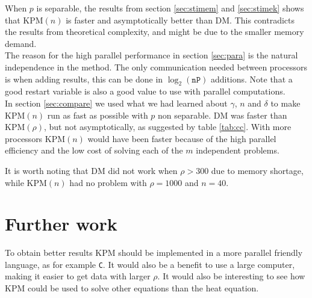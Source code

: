 When $p$ is separable, the results from section \ref{sec:stimem} and \ref{sec:stimek} shows that KPM$(n)$ is faster and asymptotically better than DM. This contradicts the results from theoretical complexity, and might be due to the smaller memory demand. \\


The reason for the high parallel performance in section \ref{sec:para} is the natural independence in the method. The only communication needed between processors is when adding results, this can be done in $\log_2(\texttt{nP})$ additions. Note that a good restart variable is also a good value to use with parallel computations. \\

In section \ref{sec:compare} we used what we had learned about $\gamma$, $n$ and $\delta$ to make KPM$(n)$ run as fast as possible with $p$ non separable. DM was faster than KPM$(\rho)$, but not asymptotically, as suggested by table \ref{tab:cc}. With more processors KPM$(n)$ would have been faster because of the high parallel efficiency and the low cost of solving each of the $m$ independent problems.

It is worth noting that DM did not work when $\rho>300$ due to memory shortage, while KPM$(n)$ had no problem with $\rho = 1000$ and $n = 40$. \\




\chapter*{Further work}%
To obtain better results KPM should be implemented in a more parallel friendly language, as for example \texttt{C}. It would also be a benefit to use a large computer, making it easier to get data with larger $\rho$.
It would also be interesting to see how KPM could be used to solve other equations than the heat equation.
